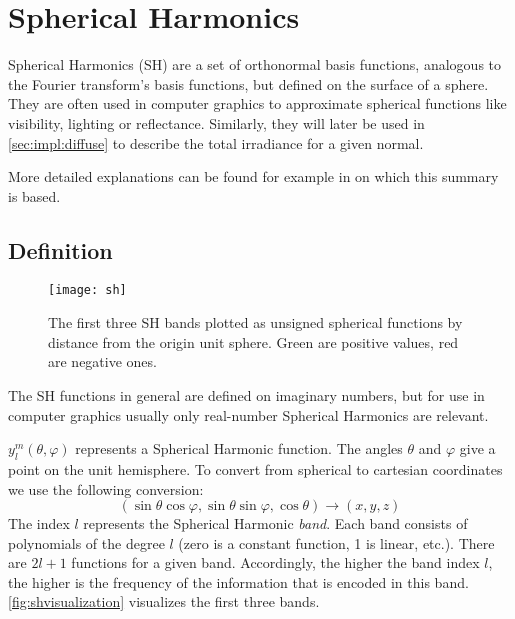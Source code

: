 \documentclass[thesis.tex]{subfiles}
\begin{document}
\section{Spherical Harmonics}\label{sec:pre:sh}
Spherical Harmonics (SH) are a set of orthonormal basis functions, analogous to the Fourier transform's basis functions, but defined on the surface of a sphere.
They are often used in computer graphics to approximate spherical functions like visibility, lighting or reflectance. Similarly, they will later be used in \autoref{sec:impl:diffuse} to describe the total irradiance for a given normal.

More detailed explanations can be found for example in \cite{bib:grittysph, bib:stupidsph} on which this summary is based.

\subsection{Definition} \label{chap:sh:def}
\begin{figure}[h]
	\centering
	\texttt{[image: sh]}
	\caption{\cite{bib:grittysph} The first three SH bands plotted as unsigned spherical functions by distance from the origin unit sphere. Green are positive values, red are negative ones.}
	\label{fig:shvisualization}
\end{figure}
The SH functions in general are defined on imaginary numbers, but for use in computer graphics usually only real-number Spherical Harmonics are relevant.

$y^m_l(\theta, \varphi)$ represents a Spherical Harmonic function.
The angles $\theta$ and $\varphi$ give a point on the unit hemisphere.
To convert from spherical to cartesian coordinates we use the following conversion:
\begin{equation} \label{equ:postoangle}
(\sin\theta\cos\varphi, \sin\theta\sin\varphi, \cos\theta) \rightarrow (x,y,z)
\end{equation}
The index $l$ represents the Spherical Harmonic \emph{band}.
Each band consists of polynomials of the degree $l$ (zero is a constant function, 1 is linear, etc.).
There are $2l+1$ functions for a given band.
Accordingly, the higher the band index $l$, the higher is the frequency of the information that is encoded in this band.
\autoref{fig:shvisualization} visualizes the first three bands.
\end{document}

